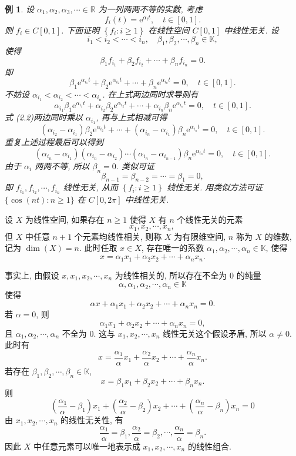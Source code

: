 \documentclass[openany]{ctexbook}
\theoremstyle{kaiti}
\theoremstyle{normal}
\newtheorem{example}{例}[section]
\begin{document}
\begin{example}
设 $\alpha_1, \alpha_2, \alpha_3, \cdots \in \mathbb{R}$ 为一列两两不等的实数, 考虑
$$
f_{i}(t)=\mathrm{e}^{\alpha_{i} t}, \quad t \in[0,1].
$$
则 $f_{i} \in C[0,1]$. 下面证明 $\left\{f_{i}: i \geqslant 1\right\}$ 在线性空间 $C[0,1]$ 中线性无关. 设
$$
i_1<i_2<\cdots<i_n, \quad \beta_1, \beta_2, \cdots, \beta_n \in \mathbb{K},
$$
使得
$$
\beta_1 f_{i_1}+\beta_2 f_{i_2}+\cdots+\beta_n f_{i_n}=0.
$$
即
\begin{equation}
  \beta_1 \mathrm{e}^{\alpha_{i_1}{t}}+\beta_2 \mathrm{e}^{\alpha_{i_2}{t}}+\cdots+\beta_n \mathrm{e}^{\alpha_{i_n}{t}}=0, \quad t \in[0,1].
\end{equation}
不妨设 $\alpha_{i_1}<\alpha_{i_2}<\cdots<\alpha_{i_n}$. 在上式两边同时求导则有
$$
\alpha_{i_1} \beta_1 \mathrm{e}^{\alpha_{i_1}t}+\alpha_{i_2} \beta_2 \mathrm{e}^{\alpha_{i_2}t}+\cdots+\alpha_{i_n} \beta_n \mathrm{e}^{\alpha_{i_n}t}=0, \quad t \in[0,1].
$$
式 (2.2)两边同时乘以 $\alpha_{i_1}$, 再与上式相减可得
$$
\left(\alpha_{i_2}-\alpha_{i_1}\right) \beta_2 \mathrm{e}^{\alpha_{i_2}t}+\cdots+\left(\alpha_{i_n}-\alpha_{i_1}\right) \beta_n \mathrm{e}^{\alpha_{i_n}t}=0, \quad t \in[0,1].
$$
重复上述过程最后可以得到
$$
\left(\alpha_{i_n}-\alpha_{i_1}\right)\left(\alpha_{i_n}-\alpha_{i_2}\right) \cdots\left(\alpha_{i_n}-\alpha_{i_{n-1}}\right) \beta_n \mathrm{e}^{\alpha_{i_n}t}=0, \quad t \in[0,1].
$$
由于 $\alpha_{i}$ 两两不等, 所以 $\beta_n=0$. 类似可证
$$
\beta_{n-1}=\beta_{n-2}=\cdots=\beta_1=0,
$$
即 $f_{i_1}, f_{i_2}, \cdots, f_{i_n}$ 线性无关, 从而 $\left\{f_{i}: i \geqslant 1\right\}$ 线性无关. 用类似方法可证 $\{\cos (n t): n \geqslant 1\}$ 在 $C[0,2 \pi]$ 中线性无关.
\end{example}

设 $X$ 为线性空间, 如果存在 $n \geqslant 1$ 使得 $X$ 有 $n$ 个线性无关的元素
$$
x_1, x_2, \cdots, x_n \text {, }
$$
但 $X$ 中任意 $n+1$ 个元素均线性相关, 则称 $X$ 为有限维空间, $n$ 称为 $X$ 的维数, 记为 $\operatorname{dim}(X)=n$. 此时任取 $x \in X$, 存在唯一的系数 $\alpha_1, \alpha_2, \cdots, \alpha_n \in \mathbb{K}$, 使得
$$
x=\alpha_1 x_1+\alpha_2 x_2+\cdots+\alpha_n x_n.
$$

事实上, 由假设 $x, x_1, x_2, \cdots, x_n$ 为线性相关的, 所以存在不全为 0 的纯量
$$
\alpha, \alpha_1, \alpha_2, \cdots, \alpha_n \in \mathbb{K}
$$
使得
$$
\alpha x+\alpha_1 x_1+\alpha_2 x_2+\cdots+\alpha_n x_n=0.
$$
若 $\alpha=0$, 则
$$
\alpha_1 x_1+\alpha_2 x_2+\cdots+\alpha_n x_n=0,
$$
且 $\alpha_1, \alpha_2, \cdots, \alpha_n$ 不全为 0. 这与 $x_1, x_2, \cdots, x_n$ 线性无关这个假设矛盾, 所以 $\alpha \neq 0$. 此时有
$$
x=\frac{\alpha_1}{\alpha} x_1+\frac{\alpha_2}{\alpha} x_2+\cdots+\frac{\alpha_n}{\alpha} x_n.
$$
若存在 $\beta_1, \beta_2, \cdots, \beta_n \in \mathbb{K}$,
$$
x=\beta_1 x_1+\beta_2 x_2+\cdots+\beta_n x_n.
$$
则
$$
\left(\frac{\alpha_1}{\alpha}-\beta_1\right) x_1+\left(\frac{\alpha_2}{\alpha}-\beta_2\right) x_2+\cdots+\left(\frac{\alpha_n}{\alpha}-\beta_n\right) x_n=0
$$
由 $x_1, x_2, \cdots, x_n$ 的线性无关性, 有
$$
\frac{\alpha_1}{\alpha}=\beta_1, \frac{\alpha_2}{\alpha}=\beta_2, \cdots, \frac{\alpha_n}{\alpha}=\beta_n.
$$
因此 $X$ 中任意元素可以唯一地表示成 $x_1, x_2, \cdots, x_n$ 的线性组合.
\end{document}
